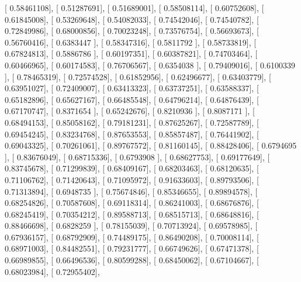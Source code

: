 \documentclass{article}
\begin{document}
       [ 0.58461108],
       [ 0.51287691],
       [ 0.51689001],
       [ 0.58508114],
       [ 0.60752608],
       [ 0.61845008],
       [ 0.53269648],
       [ 0.54082033],
       [ 0.74542046],
       [ 0.74540782],
       [ 0.72849986],
       [ 0.68000856],
       [ 0.70023248],
       [ 0.73576754],
       [ 0.56693673],
       [ 0.56760416],
       [ 0.6383447 ],
       [ 0.58347316],
       [ 0.5811792 ],
       [ 0.58733819],
       [ 0.67824813],
       [ 0.5886786 ],
       [ 0.60197351],
       [ 0.60387821],
       [ 0.74703464],
       [ 0.60466965],
       [ 0.60174583],
       [ 0.76706567],
       [ 0.6354038 ],
       [ 0.79409016],
       [ 0.6100339 ],
       [ 0.78465319],
       [ 0.72574528],
       [ 0.61852956],
       [ 0.62496677],
       [ 0.63403779],
       [ 0.63951027],
       [ 0.72409007],
       [ 0.63413323],
       [ 0.63737251],
       [ 0.63588337],
       [ 0.65182896],
       [ 0.65627167],
       [ 0.66485548],
       [ 0.64796214],
       [ 0.64876439],
       [ 0.67170747],
       [ 0.8371654 ],
       [ 0.65242676],
       [ 0.8210936 ],
       [ 0.8087171 ],
       [ 0.68494153],
       [ 0.85058162],
       [ 0.79181231],
       [ 0.87625267],
       [ 0.72587789],
       [ 0.69454245],
       [ 0.83234768],
       [ 0.87653553],
       [ 0.85857487],
       [ 0.76441902],
       [ 0.69043325],
       [ 0.70261061],
       [ 0.89767572],
       [ 0.81160145],
       [ 0.88428406],
       [ 0.6794695 ],
       [ 0.83676049],
       [ 0.68715336],
       [ 0.6793908 ],
       [ 0.68627753],
       [ 0.69177649],
       [ 0.83745678],
       [ 0.71299839],
       [ 0.68409167],
       [ 0.68203463],
       [ 0.68120635],
       [ 0.71106762],
       [ 0.71420643],
       [ 0.71095972],
       [ 0.91633603],
       [ 0.89793506],
       [ 0.71313894],
       [ 0.6948735 ],
       [ 0.75674846],
       [ 0.85346655],
       [ 0.89894578],
       [ 0.68254826],
       [ 0.70587608],
       [ 0.69118314],
       [ 0.86241003],
       [ 0.68676876],
       [ 0.68245419],
       [ 0.70354212],
       [ 0.89588713],
       [ 0.68515713],
       [ 0.68648816],
       [ 0.88466698],
       [ 0.6828259 ],
       [ 0.78155039],
       [ 0.70713924],
       [ 0.69578985],
       [ 0.67936157],
       [ 0.68792909],
       [ 0.74489175],
       [ 0.86490208],
       [ 0.70008114],
       [ 0.68971003],
       [ 0.84482551],
       [ 0.79231777],
       [ 0.66749626],
       [ 0.67471378],
       [ 0.66989855],
       [ 0.66496536],
       [ 0.80599288],
       [ 0.68450062],
       [ 0.67104667],
       [ 0.68023984],
       [ 0.72955402],
\end{document}
